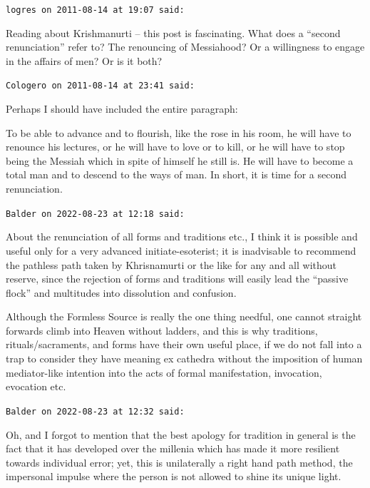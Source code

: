 \begin{footnotesize}
\begin{sffamily}

\texttt{logres on 2011-08-14 at 19:07 said:}

Reading about Krishmanurti -- this post is fascinating. What does a ``second renunciation'' refer to? The renouncing of Messiahood? Or a willingness to engage in the affairs of men? Or is it both?

\hfill

\texttt{Cologero on 2011-08-14 at 23:41 said:}

Perhaps I should have included the entire paragraph:

\begin{quotex}\footnotesize
To be able to advance and to flourish, like the rose in his room, he will have to renounce his lectures, or he will have to love or to kill, or he will have to stop being the Messiah which in spite of himself he still is. He will have to become a total man and to descend to the ways of man. In short, it is time for a second renunciation.
\end{quotex}


\hfill

\texttt{Balder on 2022-08-23 at 12:18 said:}

About the renunciation of all forms and traditions etc., I think it is possible and useful only for a very advanced initiate-esoterist; it is inadvisable to recommend the pathless path taken by Khrisnamurti or the like for any and all without reserve, since the rejection of forms and traditions will easily lead the ``passive flock'' and multitudes into dissolution and confusion.

Although the Formless Source is really the one thing needful, one cannot straight forwards climb into Heaven without ladders, and this is why traditions, rituals/sacraments, and forms have their own useful place, if we do not fall into a trap to consider they have meaning ex cathedra without the imposition of human mediator-like intention into the acts of formal manifestation, invocation, evocation etc.

\hfill

\texttt{Balder on 2022-08-23 at 12:32 said:}

Oh, and I forgot to mention that the best apology for tradition in general is the fact that it has developed over the millenia which has made it more resilient towards individual error; yet, this is unilaterally a right hand path method, the impersonal impulse where the person is not allowed to shine its unique light.


\end{sffamily}
\end{footnotesize}
